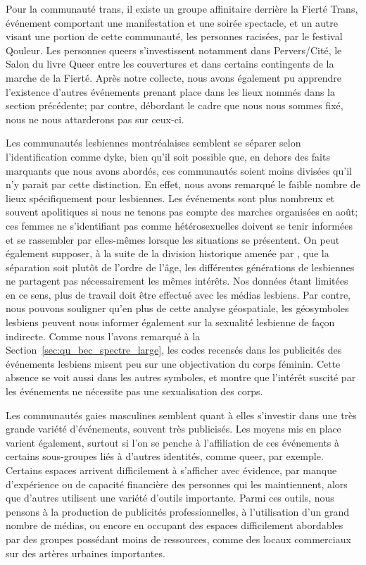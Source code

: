 Pour la communauté trans, il existe un groupe affinitaire derrière la Fierté Trans, événement comportant une manifestation et une soirée spectacle, et un autre visant une portion de cette communauté, les personnes racisées, par le festival Qouleur.
Les personnes queers s'investissent notamment dans Pervers/Cité, le Salon du livre Queer entre les couvertures et dans certains contingents de la marche de la Fierté.
Après notre collecte, nous avons également pu apprendre l'existence d'autres événements prenant place dans les lieux nommés dans la section précédente; par contre, débordant le cadre que nous nous sommes fixé, nous ne nous attarderons pas sur ceux-ci.

Les communautés lesbiennes montréalaises semblent se séparer selon l'identification comme dyke, bien qu'il soit possible que, en dehors des faits marquants que nous avons abordés, ces communautés soient moins divisées qu'il n'y parait par cette distinction.
En effet, nous avons remarqué le faible nombre de lieux spécifiquement pour lesbiennes.
Les événements sont plus nombreux et souvent apolitiques si nous ne tenons pas compte des marches organisées en août; ces femmes ne s'identifiant pas comme hétérosexuelles doivent se tenir informées et se rassembler par elles-mêmes lorsque les situations se présentent.
On peut également supposer, à la suite de la division historique amenée par \citet{Giraud2014}, que la séparation soit plutôt de l'ordre de l'âge, les différentes générations de lesbiennes ne partagent pas nécessairement les mêmes intérêts.
Nos données étant limitées en ce sens, plus de travail doit être effectué avec les médias lesbiens.
Par contre, nous pouvons souligner qu'en plus de cette analyse géospatiale, les géosymboles lesbiens peuvent nous informer également sur la sexualité lesbienne de façon indirecte.
Comme nous l'avons remarqué à la Section~\ref{sec:qu_bec_spectre_large}, les codes recensés dans les publicités des événements lesbiens misent peu sur une objectivation du corps féminin.
Cette absence se voit aussi dans les autres symboles, et montre que l'intérêt suscité par les événements ne nécessite pas une sexualisation des corps.

Les communautés gaies masculines semblent quant à elles s'investir dans une très grande variété d'événements, souvent très publicisés.
Les moyens mis en place varient également, surtout si l'on se penche à l'affiliation de ces événements à certains sous-groupes liés à d'autres identités, comme queer, par exemple.
Certains espaces arrivent difficilement à s'afficher avec évidence, par manque d'expérience ou de capacité financière des personnes qui les maintiennent, alors que d'autres utilisent une variété d'outils importante.
Parmi ces outils, nous pensons à la production de publicités professionnelles, à l'utilisation d'un grand nombre de médias, ou encore en occupant des espaces difficilement abordables par des groupes possédant moins de ressources, comme des locaux commerciaux sur des artères urbaines importantes.

